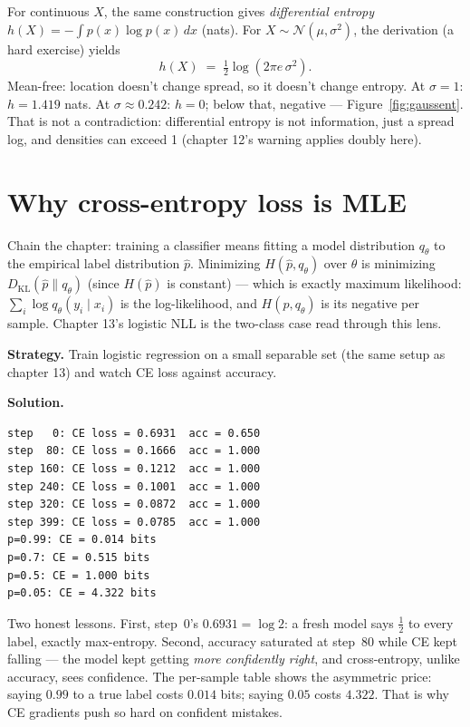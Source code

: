 For continuous $X$, the same construction gives
\emph{differential entropy}
$h(X)=-\int p(x)\log p(x)\,dx$ (nats). For
$X\sim\mathcal N(\mu,\sigma^2)$, the derivation (a hard exercise)
yields
\[
  h(X) \;=\; \tfrac12\log(2\pi e\,\sigma^2).
\]
Mean-free: location doesn't change spread, so it doesn't change
entropy. At $\sigma=1$: $h=1.419$ nats. At $\sigma\approx0.242$:
$h=0$; below that, negative --- Figure~\ref{fig:gaussent}. That is not
a contradiction: differential entropy is not information, just a
spread log, and densities can exceed 1 (chapter 12's warning applies
doubly here).

\section{Why cross-entropy loss is MLE}\label{sec:info-mle}

Chain the chapter: training a classifier means fitting a model
distribution $q_\theta$ to the empirical label distribution
$\hat p$. Minimizing $H(\hat p, q_\theta)$ over $\theta$ is minimizing
$D_{\mathrm{KL}}(\hat p\|q_\theta)$ (since $H(\hat p)$ is constant) ---
which is exactly maximum likelihood: $\sum_i\log q_\theta(y_i\mid x_i)$
is the log-likelihood, and $H(\hat p,q_\theta)$ is its negative per
sample. Chapter 13's logistic NLL is the two-class case read through
this lens.

\begin{example}\label{ex:celoss}
\textbf{Strategy.} Train logistic regression on a small separable set
(the same setup as chapter 13) and watch CE loss against accuracy.

\textbf{Solution.}
\begin{lstlisting}[caption={\ttfamily code/ch15\_ce\_loss.py run ---
CE keeps falling long after accuracy saturates.},abovecaptionskip=0pt]
step   0: CE loss = 0.6931  acc = 0.650
step  80: CE loss = 0.1666  acc = 1.000
step 160: CE loss = 0.1212  acc = 1.000
step 240: CE loss = 0.1001  acc = 1.000
step 320: CE loss = 0.0872  acc = 1.000
step 399: CE loss = 0.0785  acc = 1.000
p=0.99: CE = 0.014 bits
p=0.7: CE = 0.515 bits
p=0.5: CE = 1.000 bits
p=0.05: CE = 4.322 bits
\end{lstlisting}

Two honest lessons. First, step~0's $0.6931=\log 2$: a fresh model says
$\tfrac12$ to every label, exactly max-entropy. Second, accuracy
saturated at step~80 while CE kept falling --- the model kept getting
\emph{more confidently right}, and cross-entropy, unlike accuracy,
sees confidence. The per-sample table shows the asymmetric price:
saying $0.99$ to a true label costs $0.014$ bits; saying $0.05$ costs
$4.322$. That is why CE gradients push so hard on confident mistakes.
\end{example}

